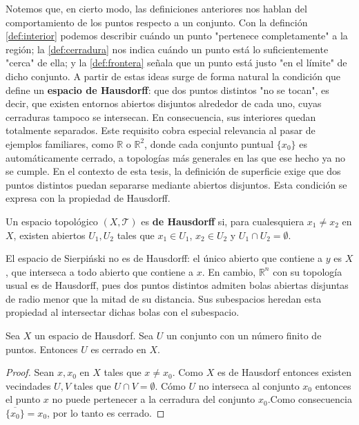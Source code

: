 Notemos que, en cierto modo, las definiciones anteriores nos hablan del comportamiento de los puntos respecto a un conjunto. Con la definción \ref{def:interior} podemos describir cuándo un punto "pertenece completamente" a la región; la \ref{def:cerradura} nos indica cuándo un punto está lo suficientemente "cerca" de ella; y la \ref{def:frontera} señala que un punto está justo "en el límite" de dicho conjunto. A partir de estas ideas surge de forma natural la condición que define un \textbf{espacio de Hausdorff}: que dos puntos distintos "no se tocan", es decir, que existen entornos abiertos disjuntos alrededor de cada uno, cuyas cerraduras tampoco se intersecan. En consecuencia, sus interiores quedan totalmente separados.
Este requisito cobra especial relevancia al pasar de ejemplos familiares, como $\mathbb{R}$ o $\mathbb{R}^2$, donde cada conjunto puntual $\{x_0\}$ es automáticamente cerrado, a topologías más generales en las que ese hecho ya no se cumple. En el contexto de esta tesis, la definición de superficie exige que dos puntos distintos puedan separarse mediante abiertos disjuntos. Esta condición se expresa con la propiedad de Hausdorff.

\begin{definition}
\label{def:espacio-hausdorff}
Un espacio topológico $(X,\mathcal{T})$ es \textbf{de Hausdorff} si, para cualesquiera $x_1\neq x_2$ en $X$, existen abiertos $U_1,U_2$ tales que $x_1\in U_1$, $x_2\in U_2$ y $U_1\cap U_2=\emptyset$.
\end{definition}

\begin{example}
El espacio de Sierpiński no es de Hausdorff: el único abierto que contiene a $y$ es $X$, que interseca a todo abierto que contiene a $x$. En cambio, $\mathbb{R}^n$ con su topología usual es de Hausdorff, pues dos puntos distintos admiten bolas abiertas disjuntas de radio menor que la mitad de su distancia. Sus subespacios heredan esta propiedad al intersectar dichas bolas con el subespacio.
\end{example}

\begin{teorema}
\label{teo:finitos-cerrados-hausdorff}
Sea $X$ un espacio de Hausdorf. Sea $U$ un conjunto con un número finito de puntos. Entonces $U$ es cerrado en $X$.
\end{teorema}
\begin{proof}
Sean $x,x_0$ en $X$ tales que $x \neq x_0$. Como $X$ es de Hausdorf entonces existen vecindades $U,V$ tales que $U \cap V = \emptyset$.
    Cómo $U$ no interseca al conjunto ${x_0}$ entonces el punto $x$ no puede pertenecer a la cerradura del conjunto ${x_0}$.Como consecuencia $\overline{\{x_0\}} = {x_0}$, por lo tanto es cerrado.\end{proof}

